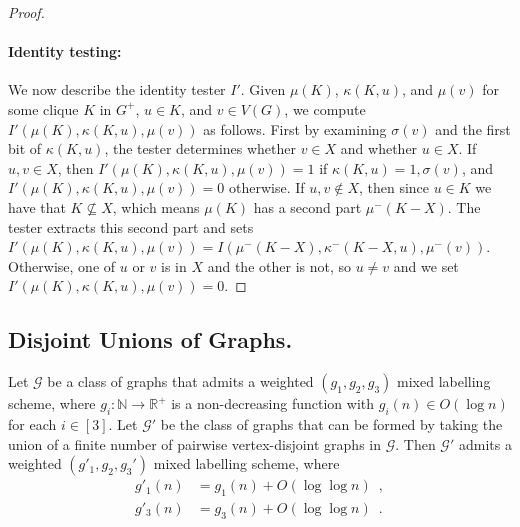 \documentclass[twoside,leqno]{article}
\providecommand{\qedhere}{}
\newcommand{\R}{\mathbb{R}}
\newcommand{\N}{\mathbb{N}}
\newcommand{\Oh}{O}
\begin{document}
\begin{proof}
  \paragraph{Identity testing:}
  We now describe the identity tester $I'$.
  Given $\mu(K)$, $\kappa(K,u)$, and $\mu(v)$ for some clique $K$ in $G^+$, $u\in K$, and $v\in V(G)$,
  we compute $I'(\mu(K),\kappa(K,u),\mu(v))$ as follows.
  First by examining $\sigma(v)$ and the first bit of $\kappa(K,u)$, the tester determines whether $v\in X$ and whether $u\in X$.
  If $u,v\in X$, then $I'(\mu(K),\kappa(K,u),\mu(v))=1$ if $\kappa(K,u)=1,\sigma(v)$, and $I'(\mu(K),\kappa(K,u),\mu(v))=0$ otherwise.
  If $u,v\not\in X$, then since $u\in K$ we have that $K\not\subseteq X$, which means $\mu(K)$ has a second part $\mu^-(K-X)$. The tester extracts this second part and sets
  $I'(\mu(K),\kappa(K,u),\mu(v)) = I(\mu^-(K-X),\kappa^-(K-X,u),\mu^-(v))$.
  Otherwise, one of $u$ or $v$ is in $X$ and the other is not, so $u\neq v$ and we set $I'(\mu(K),\kappa(K,u),\mu(v)) =0$.
  \qedhere
\end{proof}

\subsection{Disjoint Unions of Graphs.}
\label{sec:disjoint}

\begin{lem}\label{disjoint_union_ii}
  Let $\mathcal{G}$ be a class of graphs that admits a weighted $(g_1,g_2,g_3)$ mixed labelling scheme, where $g_i:\N\to\R^+$ is a non-decreasing function  with $g_i(n)\in \Oh(\log n)$ for each $i\in[3]$. Let $\mathcal{G}'$ be the class of graphs that can be formed by taking the union of a finite number of pairwise vertex-disjoint graphs in $\mathcal{G}$.
  Then $\mathcal{G}'$ admits a weighted $(g'_1,g_2,g_3')$ mixed labelling scheme, where
  \begin{align*}
    g'_1(n)
     & = g_1(n)+\Oh(\log\log n)\enspace,   \\
    g'_3(n)
     & = g_3(n)+\Oh(\log\log n) \enspace .
  \end{align*}
\end{lem}
\end{document}
